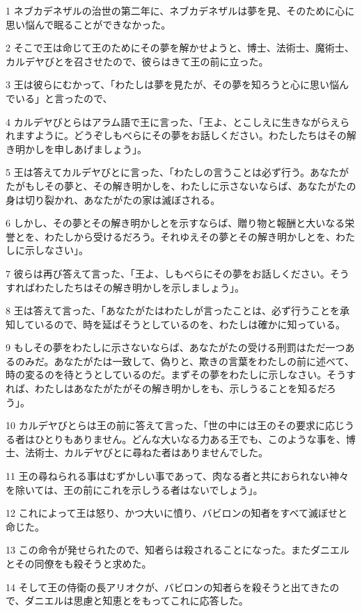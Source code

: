 \par 1 ネブカデネザルの治世の第二年に、ネブカデネザルは夢を見、そのために心に思い悩んで眠ることができなかった。
\par 2 そこで王は命じて王のためにその夢を解かせようと、博士、法術士、魔術士、カルデヤびとを召させたので、彼らはきて王の前に立った。
\par 3 王は彼らにむかって、「わたしは夢を見たが、その夢を知ろうと心に思い悩んでいる」と言ったので、
\par 4 カルデヤびとらはアラム語で王に言った、「王よ、とこしえに生きながらえられますように。どうぞしもべらにその夢をお話しください。わたしたちはその解き明かしを申しあげましょう」。
\par 5 王は答えてカルデヤびとに言った、「わたしの言うことは必ず行う。あなたがたがもしその夢と、その解き明かしを、わたしに示さないならば、あなたがたの身は切り裂かれ、あなたがたの家は滅ぼされる。
\par 6 しかし、その夢とその解き明かしとを示すならば、贈り物と報酬と大いなる栄誉とを、わたしから受けるだろう。それゆえその夢とその解き明かしとを、わたしに示しなさい」。
\par 7 彼らは再び答えて言った、「王よ、しもべらにその夢をお話しください。そうすればわたしたちはその解き明かしを示しましょう」。
\par 8 王は答えて言った、「あなたがたはわたしが言ったことは、必ず行うことを承知しているので、時を延ばそうとしているのを、わたしは確かに知っている。
\par 9 もしその夢をわたしに示さないならば、あなたがたの受ける刑罰はただ一つあるのみだ。あなたがたは一致して、偽りと、欺きの言葉をわたしの前に述べて、時の変るのを待とうとしているのだ。まずその夢をわたしに示しなさい。そうすれば、わたしはあなたがたがその解き明かしをも、示しうることを知るだろう」。
\par 10 カルデヤびとらは王の前に答えて言った、「世の中には王のその要求に応じうる者はひとりもありません。どんな大いなる力ある王でも、このような事を、博士、法術士、カルデヤびとに尋ねた者はありませんでした。
\par 11 王の尋ねられる事はむずかしい事であって、肉なる者と共におられない神々を除いては、王の前にこれを示しうる者はないでしょう」。
\par 12 これによって王は怒り、かつ大いに憤り、バビロンの知者をすべて滅ぼせと命じた。
\par 13 この命令が発せられたので、知者らは殺されることになった。またダニエルとその同僚をも殺そうと求めた。
\par 14 そして王の侍衛の長アリオクが、バビロンの知者らを殺そうと出てきたので、ダニエルは思慮と知恵とをもってこれに応答した。
